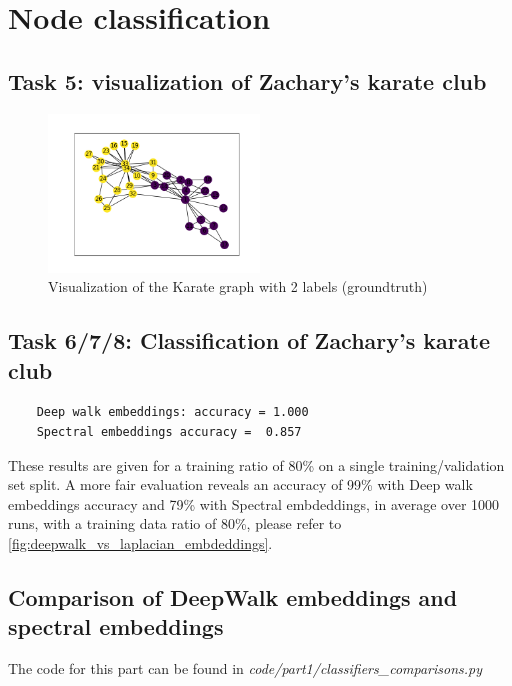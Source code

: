 \documentclass[a4paper]{article}
\begin{document}
\section{Node classification}
\subsection*{Task 5: visualization of Zachary's karate club}

\begin{figure}[ht]
    \centering
    \includegraphics[width=0.5\textwidth]{figures/labeled_karate_graph.png}
    \caption{Visualization of the Karate graph with 2 labels (groundtruth)}
    \label{fig:karate_labeled}
\end{figure}

\break
\subsection*{Task 6/7/8: Classification of Zachary's karate club}
\begin{verbatim}
    Deep walk embeddings: accuracy = 1.000
    Spectral embeddings accuracy =  0.857
\end{verbatim}
These results are given for a training ratio of 80\% on a single training/validation set split. 
A more fair evaluation reveals an accuracy of 99\% with Deep walk embeddings accuracy and 79\% with Spectral embdeddings,
in average over 1000 runs, with a training data ratio of 80\%,
please refer to \ref{fig:deepwalk_vs_laplacian_embdeddings}.
\subsection*{Comparison of DeepWalk embeddings and spectral embeddings}
The code for this part can be found in \textit{code/part1/classifiers\_comparisons.py}
\end{document}
